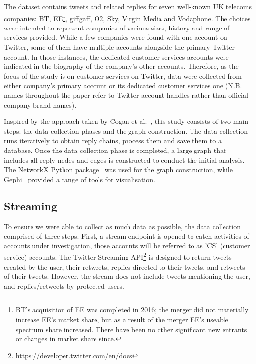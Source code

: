 \documentclass[sigconf]{acmart}
\begin{document}
The dataset contains tweets and related replies for seven well-known
UK telecoms companies: BT, EE\footnote{BT's acquisition of EE was
completed in 2016; the merger did not materially increase EE's market
share, but as a result of the merger EE's useable spectrum share
increased. There have been no other significant new entrants or
changes in market share since.}, giffgaff, O2, Sky, Virgin Media and
Vodaphone. The choices were intended to represent companies of various
sizes, history and range of services provided. While a few companies
were found with one account on Twitter, some of them have multiple
accounts alongside the primary Twitter account. In those instances,
the dedicated customer services accounts were indicated in the
biography of the company's other accounts. Therefore, as the focus of
the study is on customer services on Twitter, data were collected from
either company's primary account or its dedicated customer services
one (N.B. names throughout the paper refer to Twitter account handles
rather than official company brand names).

Inspired by the approach taken by Cogan et al.~\cite{Cogan2012}, this
study consists of two main steps: the data collection phases and the
graph construction. The data collection runs iteratively to obtain
reply chains, process them and save them to a database. Once the data
collection phase is completed, a large graph that includes all reply
nodes and edges is constructed to conduct the initial analysis. The
NetworkX Python package~\cite{Hagberg2008} was used for the graph
construction, while Gephi~\cite{Bastian2009} provided a range of tools
for visualisation.


\subsection{Streaming}

To ensure we were able to collect as much data as possible, the data
collection comprised of three steps. First, a stream endpoint is
opened to catch activities of accounts under investigation, those
accounts will be referred to as 'CS' (customer service)
accounts. The Twitter Streaming
API\footnote{\url{https://developer.twitter.com/en/docs}} is designed
to return tweets created by the user, their retweets, replies directed
to their tweets, and retweets of their tweets. However, the stream
does not include tweets mentioning the user, and replies/retweets by
protected users.
\end{document}
